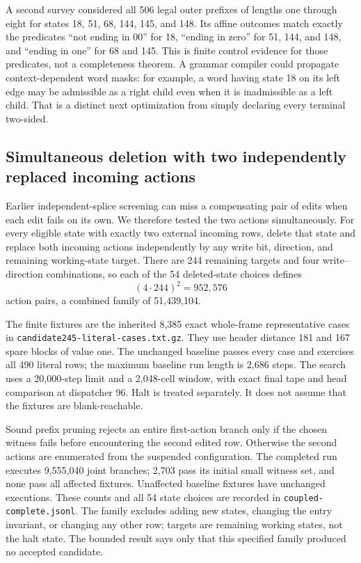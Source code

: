 A second survey considered all 506 legal outer prefixes of lengths one
through eight for states 18, 51, 68, 144, 145, and 148. Its affine outcomes
match exactly the predicates ``not ending in $00$'' for 18, ``ending in zero''
for 51, 144, and 148, and ``ending in one'' for 68 and 145. This is finite
control evidence for those predicates, not a completeness theorem.
A grammar compiler could propagate context-dependent word masks: for
example, a word having state 18 on its left edge may be admissible as a right
child even when it is inadmissible as a left child. That is a distinct next
optimization from simply declaring every terminal two-sided.

\subsection{Simultaneous deletion with two independently replaced incoming actions}

Earlier independent-splice screening can miss a compensating pair of edits
when each edit fails on its own. We therefore tested the two actions
simultaneously. For every eligible state with exactly two external incoming
rows, delete that state and replace both incoming actions independently by
any write bit, direction, and remaining working-state target. There are
244 remaining targets and four write--direction combinations, so each of
the 54 deleted-state choices defines
\[
(4\cdot244)^2=952,576
\]
action pairs, a combined family of 51,439,104.

The finite fixtures are the inherited 8,385 exact whole-frame representative
cases in \nolinkurl{candidate245-literal-cases.txt.gz}. They use header distance
181 and 167 spare blocks of value one. The unchanged baseline passes every
case and exercises all 490 literal rows; the maximum baseline run length
is 2,686 steps. The search uses a 20,000-step limit and a 2,048-cell window,
with exact final tape and head comparison at dispatcher 96. Halt is treated
separately. It does not assume that the fixtures are blank-reachable.

Sound prefix pruning rejects an entire first-action branch only if the
chosen witness fails before encountering the second edited row. Otherwise
the second actions are enumerated from the suspended configuration. The
completed run executes 9,555,040 joint branches; 2,703 pass its initial
small witness set, and none pass all affected fixtures. Unaffected baseline
fixtures have unchanged executions. These counts and all 54 state choices
are recorded in \texttt{coupled-complete.jsonl}. The family excludes adding
new states, changing the entry invariant, or changing any other row; targets
are remaining working states, not the halt state. The bounded result says
only that this specified family produced no accepted candidate.

